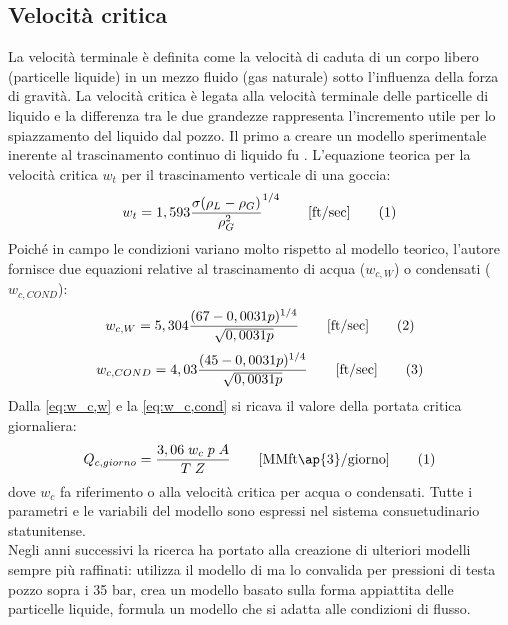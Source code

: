 \subsection{Velocità critica}
La velocità terminale è definita come la velocità di caduta di un corpo libero (particelle liquide) in un mezzo fluido (gas naturale) sotto l'influenza della forza di gravità. La velocità critica è legata alla velocità terminale delle particelle di liquido e la differenza tra le due grandezze rappresenta l'incremento utile per lo spiazzamento del liquido dal pozzo. Il primo a creare un modello sperimentale inerente al trascinamento continuo di liquido fu \textcite{turner1969analysis}. L'equazione teorica per la velocità critica \(w_t\) per il trascinamento verticale di una goccia:
\[w_t= 1,593\dfrac{\sigma{(\rho_L-\rho_G)}}{\rho_G^2}^{1/4} \qquad\textrm{[ft/sec]} \addtag \label{eq:turnerwc} \]
Poiché in campo le condizioni variano molto rispetto al modello teorico, l'autore fornisce due equazioni relative al trascinamento di acqua (\(w_{c,W}\)) o condensati (\(w_{c,COND}\)):
\[w_{c,W} = 5,304 \dfrac{(67-0,0031p)^{1/4}}{\sqrt{0,0031p}}  \qquad\textrm{[ft/sec]} \label{eq:w_c,w} \addtag\]
\[w_{c,COND} = 4,03 \dfrac{(45-0,0031p)^{1/4}}{\sqrt{0,0031p}}  \qquad\textrm{[ft/sec]} \label{eq:w_c,cond} \addtag\]
Dalla \eqref{eq:w_c,w} e la \eqref{eq:w_c,cond} si ricava il valore della portata critica giornaliera:
\[Q_{c,giorno}=\dfrac{3,06 \; w_c \; p \; A}{T \; Z}  \qquad \textrm{[MMft\ap{3}/giorno]} \addtag \]
dove \(w_c\) fa riferimento o alla velocità critica per acqua o condensati. Tutte i parametri e le variabili del modello sono espressi nel sistema consuetudinario statunitense. \\
Negli anni successivi la ricerca ha portato alla creazione di ulteriori modelli sempre più raffinati: \textcite{coleman1991new} utilizza il modello di \citeauthor{turner1969analysis} ma lo convalida per pressioni di testa pozzo sopra i 35 bar, \textcite{li2001new} crea un modello basato sulla forma appiattita delle particelle liquide, \textcite{nosseir1997new} formula un modello che si adatta alle condizioni di flusso.

